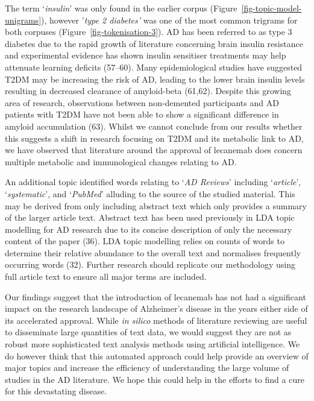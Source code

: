 \documentclass[
  a4paper,
]{article}
\begin{document}
The term `\emph{insulin}' was only found in the earlier corpus
(Figure~\ref{fig-topic-model-unigrams}), however '\emph{type 2
diabetes'} was one of the most common trigrams for both corpuses
(Figure~\ref{fig-tokenisation-3}). AD has been referred to as type 3
diabetes due to the rapid growth of literature concerning brain insulin
resistance and experimental evidence has shown insulin sensitiser
treatments may help attenuate learning deficits (57--60). Many
epidemiological studies have suggested T2DM may be increasing the risk
of AD, leading to the lower brain insulin levels resulting in decreased
clearance of amyloid-beta (61,62). Despite this growing area of
research, observations between non-demented participants and AD patients
with T2DM have not been able to show a significant difference in amyloid
accumulation (63). Whilst we cannot conclude from our results whether
this suggests a shift in research focusing on T2DM and its metabolic
link to AD, we have observed that literature around the approval of
lecanemab does concern multiple metabolic and immunological changes
relating to AD.

An additional topic identified words relating to `\emph{AD Reviews}'
including `\emph{article}', `\emph{systematic}', and `\emph{PubMed}'
alluding to the source of the studied material. This may be derived from
only including abstract text which only provides a summary of the larger
article text. Abstract text has been used previously in LDA topic
modelling for AD research due to its concise description of only the
necessary content of the paper (36). LDA topic modelling relies on
counts of words to determine their relative abundance to the overall
text and normalises frequently occurring words (32). Further research
should replicate our methodology using full article text to ensure all
major terms are included.

Our findings suggest that the introduction of lecanemab has not had a
significant impact on the research landscape of Alzheimer's disease in
the years either side of its accelerated approval. While \emph{in
silico} methods of literature reviewing are useful to disseminate large
quantities of text data, we would suggest they are not as robust more
sophisticated text analysis methods using artificial intelligence. We do
however think that this automated approach could help provide an
overview of major topics and increase the efficiency of understanding
the large volume of studies in the AD literature. We hope this could
help in the efforts to find a cure for this devastating disease.
\end{document}
